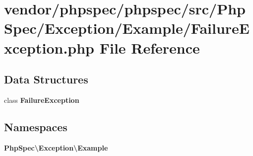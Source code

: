 \section{vendor/phpspec/phpspec/src/\+Php\+Spec/\+Exception/\+Example/\+Failure\+Exception.php File Reference}
\label{_failure_exception_8php}
\subsection*{Data Structures}
\begin{DoxyCompactItemize}
\item 
class {\bf Failure\+Exception}
\end{DoxyCompactItemize}
\subsection*{Namespaces}
\begin{DoxyCompactItemize}
\item 
 {\bf Php\+Spec\textbackslash{}\+Exception\textbackslash{}\+Example}
\end{DoxyCompactItemize}
